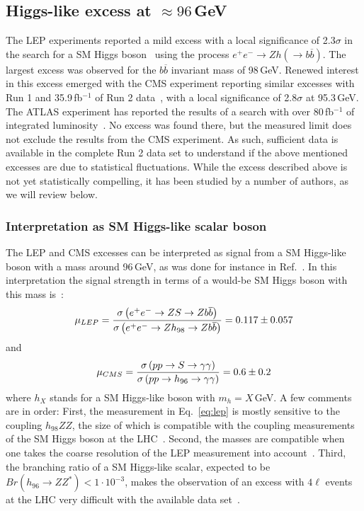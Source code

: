 \documentclass[10pt]{article}
\begin{document}
\subsection[Higgs-like excess at $\approx96$\,GeV]{\boldmath Higgs-like excess at $\approx96$\,GeV}
\label{sec:96}

The LEP experiments reported a mild excess with a local significance of 2.3$\sigma$ in the search for a SM Higgs boson~\cite{LEPWorkingGroupforHiggsbosonsearches:2003ing} using the process $e^+e^-\rightarrow Zh(\rightarrow b\overline{b})$. 
The largest excess was observed for the $b\overline{b}$ invariant mass of 98\,GeV. Renewed interest in this excess emerged with the CMS experiment reporting similar excesses with Run 1 and 35.9\,fb$^{-1}$ of Run 2 data~\cite{CMS:2018cyk}, with a local significance of 2.8$\sigma$ at 95.3\,GeV. The ATLAS experiment has reported the results of a search with over 80\,fb$^{-1}$ of integrated luminosity~\cite{ATLAS:2018xad}. No excess was found there, but the measured limit does not exclude the results from the CMS experiment. As such, sufficient data is available in the complete Run 2 data set to understand if the above mentioned excesses are due to statistical fluctuations.    
While the excess described above is not yet statistically compelling, it has been studied by a number of authors, as we will review below.


\subsubsection{Interpretation as SM Higgs-like scalar boson}
%
The LEP and CMS excesses can be interpreted as signal from a SM Higgs-like boson with a mass around 96\,GeV, as was done for instance in Ref.~\cite{Fox:2017uwr}.
In this interpretation the signal strength in terms of a would-be SM Higgs boson with this mass is~\cite{Cao:2016uwt,Biekotter:2019kde}:
\begin{equation}
\mu_{LEP}= {\sigma\left(e^+e^-\rightarrow ZS \rightarrow Zb\overline{b}  \right)   \over \sigma\left(e^+e^-\rightarrow Zh_{98} \rightarrow Zb\overline{b}  \right)} = 0.117\pm 0.057
\label{eq:lep}
\end{equation}
and
\begin{equation}
\mu_{CMS}= {\sigma\left(pp\rightarrow S \rightarrow \gamma\gamma  \right)   \over \sigma\left(pp\rightarrow h_{96} \rightarrow \gamma\gamma  \right)} = 0.6\pm 0.2
\label{eq:cms}
\end{equation}
where $h_{X}$ stands for a SM Higgs-like boson with $m_h=X$\,GeV. 
A few comments are in order:
First, the measurement in Eq.~\eqref{eq:lep} is mostly sensitive to the coupling $h_{98}ZZ$, the size of which is compatible with the coupling measurements of the SM Higgs boson at the LHC~\cite{CMS:2012vby,ATLAS:2013xga,CMS:2020gsy,ATLAS:2020qdt}. 
Second, the masses are compatible when one takes the coarse resolution of the LEP measurement into account~\cite{Heinemeyer:2018wzl}.
Third, the branching ratio of a SM Higgs-like scalar, expected to be $Br(h_{96}\rightarrow ZZ^*)<1\cdot 10^{-3}$, makes the observation of an excess with $4\ell$ events at the LHC very difficult with the available data set~\cite{ATLAS:2020wny,CMS:2021ugl}.
\end{document}
